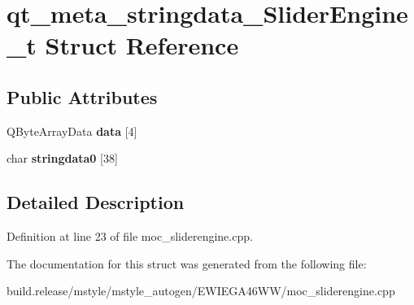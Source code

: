 \hypertarget{structqt__meta__stringdata___slider_engine__t}{}\section{qt\+\_\+meta\+\_\+stringdata\+\_\+\+Slider\+Engine\+\_\+t Struct Reference}
\label{structqt__meta__stringdata___slider_engine__t}
\subsection*{Public Attributes}
\begin{DoxyCompactItemize}
\item 
\mbox{\label{structqt__meta__stringdata___slider_engine__t_af0a69d35c301d1cbba0ae14d678b1a46}} 
Q\+Byte\+Array\+Data {\bfseries data} \mbox{[}4\mbox{]}
\item 
\mbox{\label{structqt__meta__stringdata___slider_engine__t_aa7dcc0d9e1997af8b3b1c1335a1ee8c7}} 
char {\bfseries stringdata0} \mbox{[}38\mbox{]}
\end{DoxyCompactItemize}


\subsection{Detailed Description}


Definition at line 23 of file moc\+\_\+sliderengine.\+cpp.



The documentation for this struct was generated from the following file\+:\begin{DoxyCompactItemize}
\item 
build.\+release/mstyle/mstyle\+\_\+autogen/\+E\+W\+I\+E\+G\+A46\+W\+W/moc\+\_\+sliderengine.\+cpp\end{DoxyCompactItemize}
